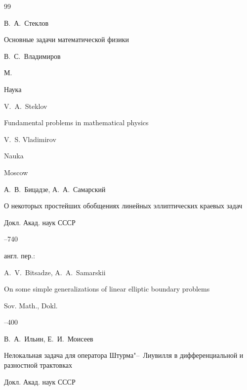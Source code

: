 \begin{thebibliography}{99}






\by В.~А.~Стеклов

\book Основные задачи математической физики

\ed В.~С.~Владимиров

\publaddr М.

\publ Наука



\misctransl

\by V.~A.~Steklov 

\book Fundamental problems in mathematical physics

\ed V.~S. Vladimirov

\publ Nauka

\publaddr Moscow






\by А.~В.~Бицадзе, А.~А.~Самарский

\paper О некоторых простейших обобщениях линейных эллиптических краевых задач

\jour Докл. Акад. наук СССР




--740

\transl англ. пер.:~

\by A.~V.~Bitsadze,  A.~A.~Samarskii

\paper On some simple generalizations of linear elliptic boundary problems

\jour Sov. Math., Dokl.


--400 







\by В.~А.~Ильин, Е.~И.~Моисеев

\paper Нелокальная задача для оператора Штурма"--~Лиувилля в дифференциальной и разностной трактовках 

\jour Докл. Акад. наук СССР


\end{thebibliography}
